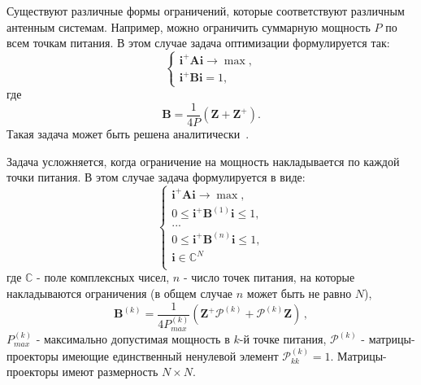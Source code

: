 Существуют различные формы ограничений, которые соответствуют различным антенным системам. Например, можно ограничить суммарную мощность $P$ по всем точкам питания. В этом случае задача оптимизации формулируется так:
%
     \begin{equation}
        \begin{cases}
           \textbf{i}^{+}\textbf{Ai} \rightarrow \max,\\
           \textbf{i}^{+}\textbf{Bi} = 1,
         \end{cases}
         \label{eq:task1}
    \end{equation}
%
где
%
    \begin{equation}
        \textbf{B} = \frac{1}{4P}(\textbf{Z} + \textbf{Z}^{+}).
        \label{eq:B}
    \end{equation}
%
Такая задача может быть решена аналитически~\cite{yurkov:farkv}.

Задача усложняется, когда ограничение на мощность накладывается по каждой точки питания. В этом случае задача формулируется в виде:
%
    \begin{equation}
        \begin{cases}
           \textbf{i}^{+}\textbf{Ai} \rightarrow \max,\\
           0 \leq \textbf{i}^{+}\textbf{B}^{(1)}\textbf{i} \leq 1, \\
           ...\\
           0 \leq \textbf{i}^{+}\textbf{B}^{(n)}\textbf{i} \leq 1,\\
           \textbf{i} \in \mathbb{C}^N\\
         \end{cases}
         \label{eq:task2}
    \end{equation}
%
где $\mathbb{C}$ - поле комплексных чисел, $n$ - число точек питания, на которые накладываются ограничения (в общем случае $n$ может быть не равно $N$),
%
    \begin{equation}
        \textbf{B}^{(k)} = \frac{1}{4P_{max}^{(k)}}(\textbf{Z}^{+}\mathcal{P}^{(k)} + \mathcal{P}^{(k)}\textbf{Z}) \, ,
    \end{equation}
%
$P_{max}^{(k)}$ - максимально допустимая мощность в $k$-й точке питания, $\mathcal{P}^{(k)}$ - матрицы-проекторы имеющие единственный ненулевой элемент $\mathcal{P}^{(k)}_{kk}=1$. Матрицы-проекторы имеют размерность $N \times N$.

